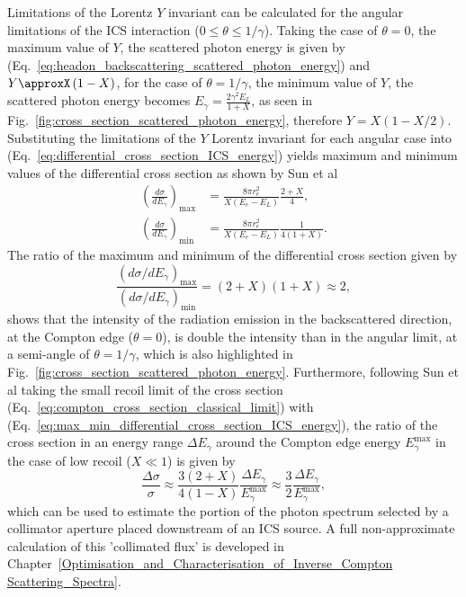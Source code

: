 \documentclass[../main.tex]{subfiles}
\begin{document}
Limitations of the Lorentz $Y$ invariant can be calculated for the angular limitations of the ICS interaction ($0 \leq \theta \leq 1/\gamma$). Taking the case of $\theta = 0$, the maximum value of $Y$, the scattered photon energy is given by (Eq.~\ref{eq:headon_backscattering_scattered_photon_energy}) and $Y\approxX\left(1-X\right)$, for the case of $\theta = 1/\gamma$, the minimum value of $Y$, the scattered photon energy becomes $E_{\gamma} = \frac{2\gamma^{2}E_{L}}{1+X}$, as seen in Fig.~\ref{fig:cross_section_scattered_photon_energy}, therefore $Y = X\left(1-X/2\right)$. Substituting the limitations of the $Y$ Lorentz invariant for each angular case into (Eq.~\ref{eq:differential_cross_section_ICS_energy}) yields maximum and minimum values of the differential cross section as shown by Sun et al \cite{sun2011theoretical}
\begin{align}
\left(\frac{d\sigma}{dE_{\gamma}}\right)_{\mathrm{max}} &= \frac{8\pi r_{e}^{2}}{X\left(E_{e}-E_{L}\right)}\frac{2+X}{4}, \nonumber \\
\left(\frac{d\sigma}{dE_{\gamma}}\right)_{\mathrm{min}} &= \frac{8\pi r_{e}^{2}}{X\left(E_{e}-E_{L}\right)}\frac{1}{4\left(1+X\right)}.
\label{eq:max_min_differential_cross_section_ICS_energy}    
\end{align}
The ratio of the maximum and minimum of the differential cross section given by 
\begin{equation}
\frac{\left(d\sigma/dE_{\gamma}\right)_{\mathrm{max}}}{\left(d\sigma/dE_{\gamma}\right)_{\mathrm{min}}} = \left(2+X\right)\left(1+X\right) \approx 2,
\label{eq:max_min_cross_section_ratio}
\end{equation}
shows that the intensity of the radiation emission in the backscattered direction, at the Compton edge ($\theta=0$), is double the intensity than in the angular limit, at a semi-angle of $\theta=1/\gamma$, which is also highlighted in Fig.~\ref{fig:cross_section_scattered_photon_energy}. Furthermore, following Sun et al \cite{sun2011theoretical} taking the small recoil limit of the cross section (Eq.~\ref{eq:compton_cross_section_classical_limit}) with (Eq.~\ref{eq:max_min_differential_cross_section_ICS_energy}), the ratio of the cross section in an energy range $\Delta E_{\gamma}$ around the Compton edge energy $E_{\gamma}^{\mathrm{max}}$ in the case of low recoil ($X \ll 1$) is given by
\begin{equation}
\frac{\Delta\sigma}{\sigma} \approx \frac{3\left(2+X\right)}{4\left(1-X\right)}\frac{\Delta E_{\gamma}}{E_{\gamma}^{\mathrm{max}}} \approx \frac{3}{2}\frac{\Delta E_{\gamma}}{E_{\gamma}^{\mathrm{max}}},
\label{eq:cross_section_factor}    
\end{equation}
which can be used to estimate the portion of the photon spectrum selected by a collimator aperture placed downstream of an ICS source. A full non-approximate calculation of this 'collimated flux' is developed in Chapter~\ref{Optimisation_and_Characterisation_of_Inverse_Compton Scattering_Spectra}. 
\end{document}
